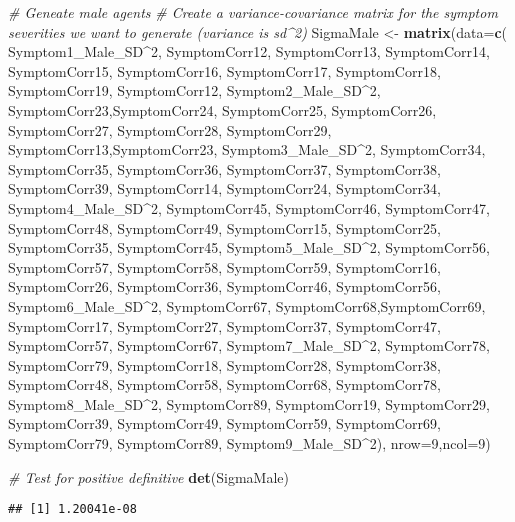 \documentclass[]{article}
\newenvironment{Shaded}{\begin{snugshade}}{\end{snugshade}}
\newcommand{\KeywordTok}[1]{\textcolor[rgb]{0.13,0.29,0.53}{\textbf{#1}}}
\newcommand{\DataTypeTok}[1]{\textcolor[rgb]{0.13,0.29,0.53}{#1}}
\newcommand{\DecValTok}[1]{\textcolor[rgb]{0.00,0.00,0.81}{#1}}
\newcommand{\StringTok}[1]{\textcolor[rgb]{0.31,0.60,0.02}{#1}}
\newcommand{\CommentTok}[1]{\textcolor[rgb]{0.56,0.35,0.01}{\textit{#1}}}
\newcommand{\OperatorTok}[1]{\textcolor[rgb]{0.81,0.36,0.00}{\textbf{#1}}}
\newcommand{\NormalTok}[1]{#1}
\begin{document}
\begin{Shaded}
\begin{Highlighting}[]
\CommentTok{# Geneate male agents}
\CommentTok{# Create a variance-covariance matrix for the symptom severities we want to generate (variance is sd^2)}
\NormalTok{SigmaMale <-}\StringTok{ }\KeywordTok{matrix}\NormalTok{(}\DataTypeTok{data=}\KeywordTok{c}\NormalTok{(}
\NormalTok{  Symptom1_Male_SD}\OperatorTok{^}\DecValTok{2}\NormalTok{, SymptomCorr12, SymptomCorr13, SymptomCorr14, SymptomCorr15, SymptomCorr16, SymptomCorr17, SymptomCorr18, SymptomCorr19,}
\NormalTok{  SymptomCorr12, Symptom2_Male_SD}\OperatorTok{^}\DecValTok{2}\NormalTok{, SymptomCorr23,SymptomCorr24, SymptomCorr25, SymptomCorr26, SymptomCorr27, SymptomCorr28, SymptomCorr29,}
\NormalTok{  SymptomCorr13,SymptomCorr23, Symptom3_Male_SD}\OperatorTok{^}\DecValTok{2}\NormalTok{, SymptomCorr34, SymptomCorr35, SymptomCorr36, SymptomCorr37, SymptomCorr38, SymptomCorr39,}
\NormalTok{  SymptomCorr14, SymptomCorr24, SymptomCorr34, Symptom4_Male_SD}\OperatorTok{^}\DecValTok{2}\NormalTok{, SymptomCorr45, SymptomCorr46, SymptomCorr47, SymptomCorr48, SymptomCorr49,}
\NormalTok{  SymptomCorr15, SymptomCorr25, SymptomCorr35, SymptomCorr45, Symptom5_Male_SD}\OperatorTok{^}\DecValTok{2}\NormalTok{, SymptomCorr56, SymptomCorr57, SymptomCorr58, SymptomCorr59,}
\NormalTok{  SymptomCorr16, SymptomCorr26, SymptomCorr36, SymptomCorr46, SymptomCorr56, Symptom6_Male_SD}\OperatorTok{^}\DecValTok{2}\NormalTok{, SymptomCorr67, SymptomCorr68,SymptomCorr69,}
\NormalTok{  SymptomCorr17, SymptomCorr27, SymptomCorr37, SymptomCorr47, SymptomCorr57, SymptomCorr67, Symptom7_Male_SD}\OperatorTok{^}\DecValTok{2}\NormalTok{, SymptomCorr78, SymptomCorr79,}
\NormalTok{  SymptomCorr18, SymptomCorr28, SymptomCorr38, SymptomCorr48, SymptomCorr58, SymptomCorr68, SymptomCorr78, Symptom8_Male_SD}\OperatorTok{^}\DecValTok{2}\NormalTok{, SymptomCorr89,}
\NormalTok{  SymptomCorr19, SymptomCorr29, SymptomCorr39, SymptomCorr49, SymptomCorr59, SymptomCorr69, SymptomCorr79, SymptomCorr89, Symptom9_Male_SD}\OperatorTok{^}\DecValTok{2}\NormalTok{),     }
  \DataTypeTok{nrow=}\DecValTok{9}\NormalTok{,}\DataTypeTok{ncol=}\DecValTok{9}\NormalTok{)}

\CommentTok{# Test for positive definitive}
\KeywordTok{det}\NormalTok{(SigmaMale)}
\end{Highlighting}
\end{Shaded}

\begin{verbatim}
## [1] 1.20041e-08
\end{verbatim}
\end{document}

